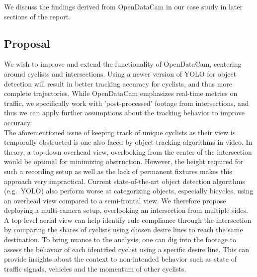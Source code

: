 We discuss the findings derived from OpenDataCam in our case study in later sections of the report.

\subsection{Proposal}
We wish to improve and extend the functionality of OpenDataCam, centering around cyclists and intersections.
Using a newer version of YOLO for object detection will result in better tracking accuracy for cyclists, 
and thus more complete trajectories.
While OpenDataCam emphasizes real-time metrics on traffic, we specifically work with 'post-processed' footage 
from intersections, and thus we can apply further assumptions about the tracking behavior to improve accuracy.
\ \\

The aforementioned issue of keeping track of unique cyclists as their view is temporally obstructed is one also faced by 
object tracking algorithms in video. In theory, a top-down overhead view, overlooking from the center of the 
intersection would be optimal for minimizing obstruction.
However, the height required for such a recording setup as well as the lack of permanent fixtures makes this 
approach very impractical. 
Current state-of-the-art object detection algorithms (e.g.~YOLO) also perform worse at categorizing objects, 
especially bicycles, using an overhead view compared to a semi-frontal view. 
We therefore propose deploying a multi-camera setup, overlooking an intersection from multiple sides.
\ \\

A top-level aerial view can help identify rule compliance through the intersection by comparing
the shares of cyclists using chosen desire lines to reach the same destination. 
To bring nuance to the analysis, one can dig into the footage to assess the behavior of 
each identified cyclist using a specific desire line. 
This can provide insights about the context to non-intended behavior such as state of traffic signals, 
vehicles and the momentum of other cyclists.